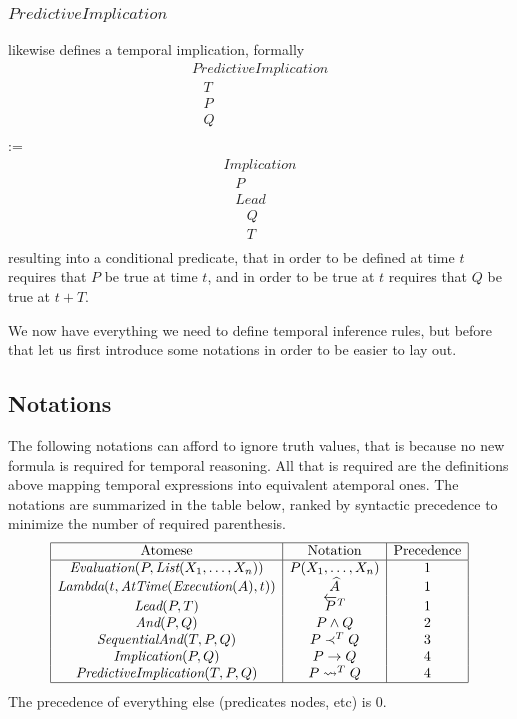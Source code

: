 \documentclass[runningheads]{llncs}
\newcommand{\SP}{\;\;\;}
\newcommand{\TEval}{\textit{Evaluation}}
\newcommand{\TList}{\textit{List}}
\newcommand{\TLamb}{\textit{Lambda}}
\newcommand{\TExec}{\textit{Execution}}
\newcommand{\TAtTime}{\textit{AtTime}}
\newcommand{\TAnd}{\textit{And}}
\newcommand{\TImpl}{\textit{Implication}}
\newcommand{\TPredImpl}{\textit{PredictiveImplication}}
\newcommand{\TSeqAnd}{\textit{SequentialAnd}}
\newcommand{\TLead}{\textit{Lead}}
\newcommand{\MAnd}{\wedge}
\newcommand{\MImpl}{\rightarrow}
\newcommand{\MPredImpl}{\leadsto}
\newcommand{\MSeqAnd}{\prec}
\newcommand{\MDo}[1]{\widehat{#1}}
\newcommand{\MLead}[2]{\overleftarrow{#1}^{#2}}
\begin{document}
\subsubsection{$\TPredImpl$} likewise defines a temporal implication,
formally
$$
\begin{array}{l}
  \TPredImpl\\
  \SP T\\
  \SP P\\
  \SP Q\\
\end{array}
$$
:=
$$
\begin{array}{l}
  \TImpl\\
  \SP P\\
  \SP \TLead\\
  \SP \SP Q\\
  \SP \SP T\\
\end{array}
$$
resulting into a conditional predicate, that in order to be defined at
time $t$ requires that $P$ be true at time $t$, and in order to be true
at $t$ requires that $Q$ be true at $t+T$.

We now have everything we need to define temporal inference rules, but
before that let us first introduce some notations in order to be
easier to lay out.

\subsection{Notations}

The following notations can afford to ignore truth values, that is
because no new formula is required for temporal reasoning.  All that
is required are the definitions above mapping temporal expressions
into equivalent atemporal ones.  The notations are summarized in the
table below, ranked by syntactic precedence to minimize the number of
required parenthesis.
$$
\begin{array}{|c|c|c|}
  \hline
  \text{Atomese} & \text{Notation} & \text{Precedence} \\
  \hline
  \TEval(P, \TList(X_1, \dots, X_n)) & P(X_1, \dots, X_n) & 1 \\
  \TLamb(t, \TAtTime(\TExec(A), t)) & \MDo{A} & 1 \\
  \TLead(P, T) & \MLead{P}{T} & 1 \\
  \TAnd(P, Q) & P \MAnd Q & 2 \\
  \TSeqAnd(T, P, Q) & P \MSeqAnd^T Q & 3 \\
  \TImpl(P, Q) & P \MImpl Q & 4 \\
  \TPredImpl(T, P, Q) & P \MPredImpl^T Q & 4 \\
  \hline
\end{array}
$$
The precedence of everything else (predicates nodes, etc) is 0.
\end{document}
